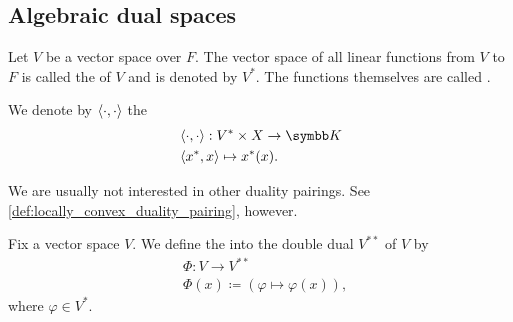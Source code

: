\subsection{Algebraic dual spaces}\label{subsec:algebraic_dual_spaces}

\begin{definition}\label{def:dual_vector_space}
  Let \( V \) be a vector space over \( F \). The vector space of all linear functions from \( V \) to \( F \) is called the  of \( V \) and is denoted by \( V^* \). The functions themselves are called .
\end{definition}

\begin{definition}\label{def:canonical_duality_pairing}
  We denote by \( \left\langle \cdot, \cdot \right\rangle \) the 
  \begin{align*}
    &\Prod \cdot \cdot: V^* \times X \to \K \\
    &\Prod {x^*} x \mapsto x^*(x).
  \end{align*}

  We are usually not interested in other duality pairings. See \cref{def:locally_convex_duality_pairing}, however.
\end{definition}

\begin{definition}\label{def:double_dual_canonical_embedding}
  Fix a vector space \( V \). We define the  into the double dual \( V^{**} \) of \( V \) by
  \begin{align*}
    &\Phi: V \to V^{**} \\
    &\Phi(x) \coloneqq (\varphi \mapsto \varphi(x)),
  \end{align*}
  where \( \varphi \in V^* \).
\end{definition}

